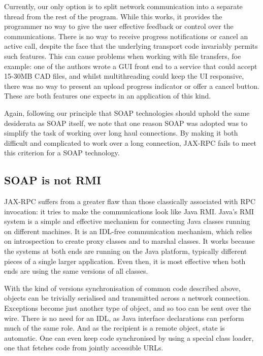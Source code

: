 Currently, our only option is to split network communication into a
separate thread from the rest of the program. While this works, it
provides the programmer no way to give the user effective feedback or
control over the communications. There is no way to receive progress
notifications or cancel an active call, despite the face that the
underlying transport code invariably permits such features. This can
cause problems when working with file transfers, foe example: one of
the authors wrote a GUI front end to a service that could accept
15-30MB CAD files, and whilst multithreading could keep the UI
responsive, there was no way to present an upload progress indicator
or offer a cancel button. These are both features one expects in an
application of this kind.

Again, following our principle that SOAP technologies should uphold
the same desiderata as SOAP itself, we note that one reason SOAP was
adopted was to simplify the task of working over long haul
connections. By making it both difficult and complicated to work over
a long connection, JAX-RPC fails to meet this criterion for a SOAP
technology.

\subsection{SOAP is not RMI}
\label{objections:soap-not-rmi}

JAX-RPC suffers from a greater flaw than those classically associated
with RPC invocation: it tries to make the communications look like
Java RMI. Java's RMI system is a simple and effective mechanism for
connecting Java classes running on different machines. It is an
IDL-free communication mechanism, which relies on introspection to
create proxy classes and to marshal classes. It works because the
systems at both ends are running on the Java platform, typically
different pieces of a single larger application. Even then, it is
most effective when both ends are using the same versions of all
classes.

With the kind of versions synchronisation of common code described
above, objects can be trivially serialised and transmitted across a
network connection. Exceptions become just another type of object, and
so too can be sent over the wire. There is no need for an IDL, as Java
interface declarations can perform much of the same role. And as the
recipient is a remote object, state is automatic. One can even keep
code synchronised by using a special class loader, one that fetches
code from jointly accessible URLs.

